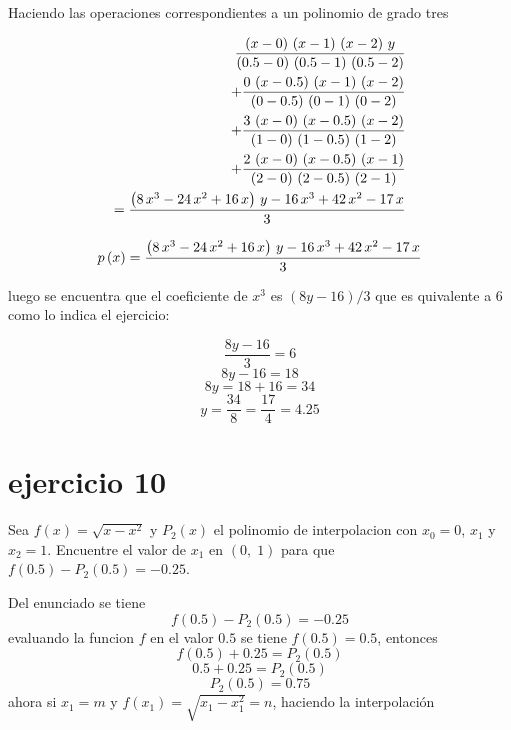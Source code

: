 Haciendo las operaciones correspondientes a un polinomio de grado tres

\begin{eqnarray}
  {{\left(x-\mbox{{}0{}}\right)\,\left(x-\mbox{{}1{}}\right)\,\left(x
 -\mbox{{}2{}}\right)\,y}\over{\left(\mbox{{}0.5{}}-\mbox{{}0{}}
 \right)\,\left(\mbox{{}0.5{}}-\mbox{{}1{}}\right)\,\left(
 \mbox{{}0.5{}}-\mbox{{}2{}}\right)}}\nonumber\\+{{\mbox{{}0{}}\,\left(x-
 \mbox{{}0.5{}}\right)\,\left(x-\mbox{{}1{}}\right)\,\left(x-
 \mbox{{}2{}}\right)}\over{\left(\mbox{{}0{}}-\mbox{{}0.5{}}\right)\,
 \left(\mbox{{}0{}}-\mbox{{}1{}}\right)\,\left(\mbox{{}0{}}-
 \mbox{{}2{}}\right)}}\nonumber\\+{{\mbox{{}3{}}\,\left(x-\mbox{{}0{}}\right)\,
 \left(x-\mbox{{}0.5{}}\right)\,\left(x-\mbox{{}2{}}\right)}\over{
 \left(\mbox{{}1{}}-\mbox{{}0{}}\right)\,\left(\mbox{{}1{}}-
 \mbox{{}0.5{}}\right)\,\left(\mbox{{}1{}}-\mbox{{}2{}}\right)}}\nonumber\\+{{
 \mbox{{}2{}}\,\left(x-\mbox{{}0{}}\right)\,\left(x-\mbox{{}0.5{}}
 \right)\,\left(x-\mbox{{}1{}}\right)}\over{\left(\mbox{{}2{}}-
 \mbox{{}0{}}\right)\,\left(\mbox{{}2{}}-\mbox{{}0.5{}}\right)\,
 \left(\mbox{{}2{}}-\mbox{{}1{}}\right)}}\nonumber\\={{\left(8\,x^3-24\,x^2+16\,
 x\right)\,y-16\,x^3+42\,x^2-17\,x}\over{3}\nonumber}
\end{eqnarray}

$$p\left(x\right)={{\left(8\,x^3-24\,x^2+16\,x\right)\,y-16\,x^3+42\,
 x^2-17\,x}\over{3}}$$

luego se encuentra que el coeficiente de $x^3$ es $(8y-16)/3$
que es quivalente a $6$ como lo indica el ejercicio:

$$\frac{8y-16}{3}=6$$
$$8y-16=18$$
$$8y=18+16=34$$
$$y=\frac{34}{8}=\frac{17}{4}=4.25$$

\section{ejercicio 10}
Sea $f\left(x\right)=\sqrt{x-x^2}$ y $P_2\left(x\right)$ el polinomio
de interpolacion con $x_0=0$, $x_1$ y $x_2=1$. Encuentre el valor de
$x_1$ en $(0,\;1)$ para que
$f\left(0.5\right)-P_2\left(0.5\right)=-0.25$.

Del enunciado se tiene
$$f\left(0.5\right)-P_2\left(0.5\right)=-0.25$$
evaluando la funcion $f$ en el valor $0.5$ se tiene $f(0.5)=0.5$, entonces
$$f\left(0.5\right)+0.25=P_2\left(0.5\right)$$
$$0.5+0.25=P_2\left(0.5\right)$$
$$P_2\left(0.5\right)=0.75$$
ahora si $x_1=m$ y $f(x_1)=\sqrt{x_1-x_1^2}=n$, haciendo la interpolación

